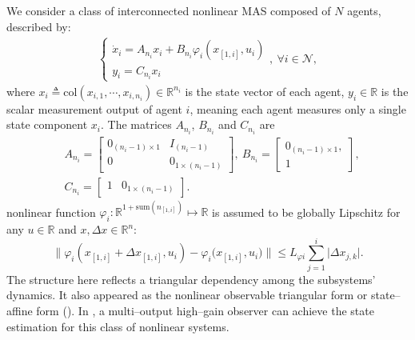 \documentclass{ifacconf}
\begin{document}
We consider a class of interconnected nonlinear MAS composed of $N$ agents, described by:
\begin{equation}
    \begin{aligned}
        \left\{\begin{array}{l}
                 \dot{x}_i= A_{n_i}x_i+B_{n_i}\varphi_i(x_{[1,i]},u_i) \\
                 y_{i} = C_{n_{i}}x_{i}
            \end{array}\right., \ \forall i \in \mathcal{N},
    \end{aligned}\label{eq:sys}
\end{equation}
where $x_i\triangleq\mathrm{col}(x_{i,1},\cdots,x_{i,n_i})\in\mathbb{R}^{n_i}$ is the state vector of each agent, 
$y_i\in\mathbb{R}$ is the scalar measurement output of agent $i$, meaning each agent measures only a single state component $x_i$.
The matrices $A_{n_i}$, $B_{n_i}$ and $C_{n_i}$ are
\begin{equation*}
    \begin{aligned}
        &A_{n_i}= \begin{bmatrix}
        0_{(n_{i}-1) \times 1} & {I_{(n_{i}-1)}} \\
        0 & 0_{  1 \times (n_{i}-1)}
    \end{bmatrix},\ B_{n_i}= \begin{bmatrix}
        0_{(n_{i}-1)\times1 }, \\ 1
    \end{bmatrix},\\ 
    &
    C_{n_i} = \begin{bmatrix}
        1 & 0_{1 \times (n_{i}-1)}
    \end{bmatrix}.
    \end{aligned}
\end{equation*}
nonlinear function $\varphi_i : \mathbb{R}^{1+\mathrm{sum}(n_{[1,i]})}\mapsto \mathbb{R}$ is assumed to be globally Lipschitz for any $u\in\mathbb{R}$ and $x,\Delta x\in\mathbb{R}^n$:
\[\big\|\varphi_i\left(x_{[1,i]}+\Delta x_{[1,i]},u_i\right)-\varphi_i\big(x_{[1,i]},u_i\big)\big\|\le L_{\varphi i}\sum^i_{j=1}\big|\Delta x_{j,k}\big|.\]
The structure here reflects a triangular dependency among the subsystems' dynamics.
It also appeared as the nonlinear observable triangular form or state--affine form (\cite{gauthier2001deterministic}).
In \cite{hammouri2010high}, a multi--output high--gain observer can achieve the state estimation for this class of nonlinear systems.
\end{document}
